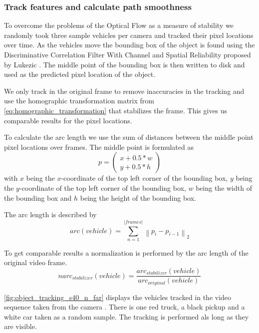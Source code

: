 \subsubsection{Track features and calculate path smoothness}
To overcome the problems of the Optical Flow as a measure of stability we randomly took three sample vehicles per camera and tracked their pixel locations over time.
As the vehicles move the bounding box of the object is found using the Discriminative Correlation Filter With Channel and Spatial Reliability proposed by Lukezic \etal{} \cite{Lukezic_2017_CVPR,opencv_library}.
The middle point of the bounding box is then written to disk and used as the predicted pixel location of the object.

We only track in the original frame to remove inaccuracies in the tracking and use the homographic transformation matrix from \autoref{eq:homographic_transformation} that stabilizes the frame.
This gives us comparable results for the pixel locations. 

To calculate the arc length we use the sum of distances between the middle point pixel locations over frames. 
The middle point is formulated as 
\begin{equation}
    p = \begin{pmatrix}
        x + 0.5 * w \\
        y + 0.5 * h
    \end{pmatrix}
\end{equation}
with $x$ being the $x$-coordinate of the top left corner of the bounding box, 
$y$ being the $y$-coordinate of the top left corner of the bounding box, 
$w$ being the width of the bounding box and
$h$ being the height of the bounding box.

The arc length is described by
\begin{equation}
    arc(vehicle) = \sum_{n = 1}^{\left\lvert frames \right\rvert } \left\lVert 
        p_{i} - p_{i-1}
    \right\rVert _2
\end{equation} 

To get comparable results a normalization is performed by the arc length of the original video frame.
\begin{equation}
    narc_{stabilizer}(vehicle) = 
    \frac{arc_{stabilizer}(vehicle)}{arc_{original}(vehicle)}
\end{equation} 

\autoref{fig:object_tracking_s40_n_far} displays the vehicles tracked in the video sequence taken from the camera . 
There is one red truck, a black pickup and a white car taken as a random sample.
The tracking is performed als long as they are visible.

